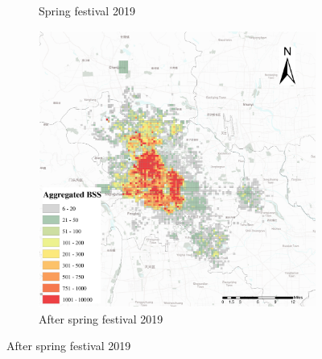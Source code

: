 \documentclass[preprints,ijgi,submit,moreauthors]{Definitions/mdpi}
\begin{document}
\begin{figure}[H]
\begin{subfigure}{.3\textwidth}
        \caption{Spring festival 2019}
    \end{subfigure}
    \begin{subfigure}{.3\textwidth}
        \includegraphics[width=\textwidth]{Figures/BSSPhase3_2019.eps}
        \caption{After spring festival 2019}
    \end{subfigure}
    

\end{figure}
\end{document}
